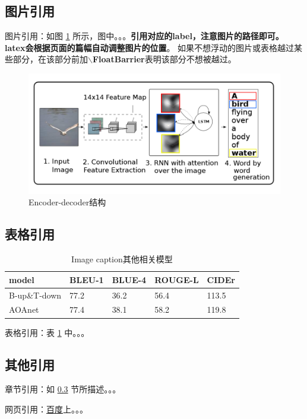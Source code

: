 \documentclass{template} %
\begin{document}
\subsection{图片引用}
图片引用：如图 \ref{fig:enc-dec} 所示，图中。。。\textbf{引用对应的label，注意图片的路径即可。}
\textbf{latex会根据页面的篇幅自动调整图片的位置}。
如果不想浮动的图片或表格越过某些部分，在该部分前加\textbf{$\backslash$FloatBarrier}表明该部分不想被越过。
\begin{figure}[ht]
  \centering
  \includegraphics[scale=1.2]{figs/pic.png}
  \caption{Encoder-decoder结构}
  \label{fig:enc-dec}
\end{figure}

\subsection{表格引用}
\begin{table}
  \centering
  \caption{Image caption其他相关模型}
  \label{tab:1}%
  \begin{tabular}{lllll}
    \toprule
    model & BLEU-1 & BLUE-4 & ROUGE-L & CIDEr  \\
    \midrule
    B-up\&T-down & 77.2 & 36.2 & 56.4 & 113.5 \\
    AOAnet & 77.4 & 38.1 & 58.2 & 119.8 \\
    \bottomrule
  \end{tabular}
\end{table}
表格引用：表 \ref{tab:1} 中。。。

\subsection{其他引用}\label{anchor-2-3}
  章节引用：如 \ref{anchor-2-3} 节所描述。。。
  
  网页引用：\href{https:www.baidu.con}{百度}上。。。
\end{document}
